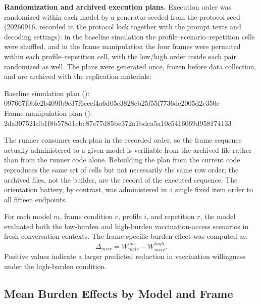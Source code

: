 \documentclass[11pt]{article}
\begin{document}
\textbf{Randomization and archived execution plans.} Execution order was randomized within each model by a generator seeded from the protocol seed (20260916, recorded in the protocol lock together with the prompt texts and decoding settings): in the baseline simulation the profile--scenario--repetition cells were shuffled, and in the frame manipulation the four frames were permuted within each profile--repetition cell, with the low/high order inside each pair randomized as well. The plans were generated once, frozen before data collection, and are archived with the replication materials:
\begin{flushleft}
{\footnotesize Baseline simulation plan ():}\\
{\footnotesize\ttfamily 097667f0bfe2b409fb9e37f6ceef4a6d05e3828eb25f55f7736de2005d2c350c}\\
{\footnotesize Frame-manipulation plan ():}\\
{\footnotesize\ttfamily 2da307521db1f8b578d1ebc87e77d85be372a1bdca5a10c5416069d958174133}
\end{flushleft}
The runner consumes each plan in the recorded order, so the frame sequence actually administered to a given model is verifiable from the archived file rather than from the runner code alone. Rebuilding the plan from the current code reproduces the same set of cells but not necessarily the same row order; the archived files, not the builder, are the record of the executed sequence. The orientation battery, by contrast, was administered in a single fixed item order to all fifteen endpoints.

For each model \(m\), frame condition \(c\), profile \(i\), and repetition \(r\), the model evaluated both the low-burden and high-burden vaccination-access scenarios in fresh conversation contexts. The frame-specific burden effect was computed as:
\[
\Delta_{mcir} = W^{low}_{mcir} - W^{high}_{mcir}.
\]
Positive values indicate a larger predicted reduction in vaccination willingness under the high-burden condition.

\subsection{Mean Burden Effects by Model and Frame}
\end{document}
